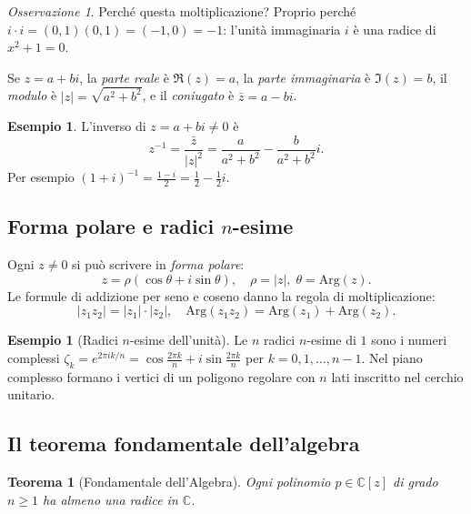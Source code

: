 \documentclass[11pt, a4paper]{book}
\theoremstyle{definition}
\newtheorem{esempio}[definizione]{Esempio}
\theoremstyle{plain}
\newtheorem{teorema}[definizione]{Teorema}
\theoremstyle{remark}
\newtheorem{osservazione}[definizione]{Osservazione}
\newcommand{\C}{\mathbb{C}}
\begin{document}
\begin{osservazione}
Perché questa moltiplicazione? Proprio perché $i \cdot i = (0,1)(0,1) = (-1, 0) = -1$: l'unità immaginaria $i$ è una radice di $x^2 + 1 = 0$.
\end{osservazione}

Se $z = a + bi$, la \emph{parte reale} è $\Re(z) = a$, la \emph{parte immaginaria} è $\Im(z) = b$, il \emph{modulo} è $|z| = \sqrt{a^2 + b^2}$, e il \emph{coniugato} è $\bar{z} = a - bi$.

\begin{exbox}
\begin{esempio}
L'inverso di $z = a + bi \neq 0$ è
\[
  z^{-1} = \frac{\bar{z}}{|z|^2} = \frac{a}{a^2+b^2} - \frac{b}{a^2+b^2}i.
\]
Per esempio $(1+i)^{-1} = \frac{1-i}{2} = \frac{1}{2} - \frac{1}{2}i$.
\end{esempio}
\end{exbox}

\subsection{Forma polare e radici $n$-esime}

Ogni $z \neq 0$ si può scrivere in \emph{forma polare}:
\[
  z = \rho(\cos\theta + i\sin\theta), \quad \rho = |z|,\; \theta = \mathrm{Arg}(z).
\]
Le formule di addizione per seno e coseno danno la regola di moltiplicazione:
\[
  |z_1 z_2| = |z_1| \cdot |z_2|, \quad \mathrm{Arg}(z_1 z_2) = \mathrm{Arg}(z_1) + \mathrm{Arg}(z_2).
\]

\begin{exbox}
\begin{esempio}[Radici $n$-esime dell'unità]
Le $n$ radici $n$-esime di $1$ sono i numeri complessi $\zeta_k = e^{2\pi i k/n} = \cos\frac{2\pi k}{n} + i\sin\frac{2\pi k}{n}$ per $k = 0, 1, \ldots, n-1$. Nel piano complesso formano i vertici di un poligono regolare con $n$ lati inscritto nel cerchio unitario.
\end{esempio}
\end{exbox}

\subsection{Il teorema fondamentale dell'algebra}

\begin{teorema}[Fondamentale dell'Algebra]
Ogni polinomio $p \in \C[z]$ di grado $n \geq 1$ ha almeno una radice in $\C$.
\end{teorema}
\end{document}

